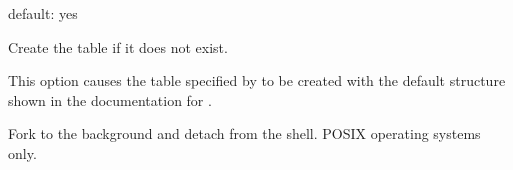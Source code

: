 \documentclass[letterpaper,10pt,english]{sphinxmanual}
\begin{document}
\begin{fulllineitems}
\label{\detokenize{mariadb-query-digest:cmdoption-mariadb-query-digest-no-create-review-table}}
\sphinxAtStartPar
default: yes

\sphinxAtStartPar
Create the {\hyperref[\detokenize{mariadb-query-digest:cmdoption-mariadb-query-digest-review}]{}} table if it does not exist.

\sphinxAtStartPar
This option causes the table specified by {\hyperref[\detokenize{mariadb-query-digest:cmdoption-mariadb-query-digest-review}]{}} to be created
with the default structure shown in the documentation for {\hyperref[\detokenize{mariadb-query-digest:cmdoption-mariadb-query-digest-review}]{}}.

\end{fulllineitems}


\begin{fulllineitems}
\label{\detokenize{mariadb-query-digest:cmdoption-mariadb-query-digest-daemonize}}
\sphinxAtStartPar
Fork to the background and detach from the shell.  POSIX
operating systems only.

\end{fulllineitems}

\end{document}
